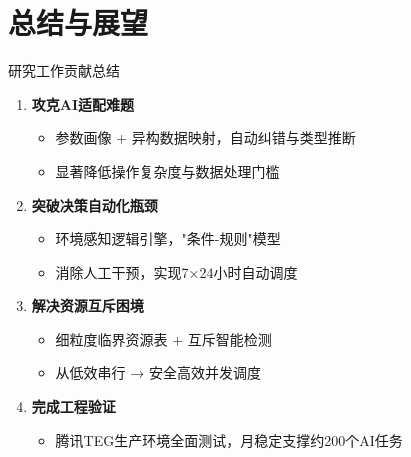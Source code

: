 \documentclass[aspectratio=169,UTF8,xcolor=table]{ctexbeamer}
\begin{document}
\section{总结与展望}

\begin{frame}{研究工作贡献总结}
  \begin{enumerate}
    \item \textbf{攻克AI适配难题}
    \begin{itemize}
      \item 参数画像 + 异构数据映射，自动纠错与类型推断
      \item 显著降低操作复杂度与数据处理门槛
    \end{itemize}

    \item \textbf{突破决策自动化瓶颈}
    \begin{itemize}
      \item 环境感知逻辑引擎，"条件-规则"模型
      \item 消除人工干预，实现7×24小时自动调度
    \end{itemize}

    \item \textbf{解决资源互斥困境}
    \begin{itemize}
      \item 细粒度临界资源表 + 互斥智能检测
      \item 从低效串行 → 安全高效并发调度
    \end{itemize}

    \item \textbf{完成工程验证}
    \begin{itemize}
      \item 腾讯TEG生产环境全面测试，月稳定支撑约200个AI任务
    \end{itemize}
  \end{enumerate}
\end{frame}
\end{document}
